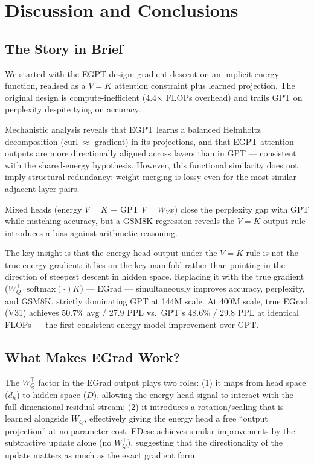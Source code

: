 \section{Discussion and Conclusions}
\label{sec:conclusions}

\subsection{The Story in Brief}

We started with the EGPT design: gradient descent on an implicit energy function,
realised as a $V{=}K$ attention constraint plus learned projection.
The original design is compute-inefficient (4.4$\times$ FLOPs overhead) and trails GPT
on perplexity despite tying on accuracy.

Mechanistic analysis reveals that EGPT learns a balanced Helmholtz decomposition
(curl $\approx$ gradient) in its projections, and that EGPT attention outputs
are more directionally aligned across layers than in GPT --- consistent with the
shared-energy hypothesis.
However, this functional similarity does not imply structural redundancy:
weight merging is lossy even for the most similar adjacent layer pairs.

Mixed heads (energy $V{=}K$ + GPT $V{=}W_V x$) close the perplexity gap with GPT
while matching accuracy, but a GSM8K regression reveals the $V{=}K$ output rule
introduces a bias against arithmetic reasoning.

The key insight is that the energy-head output under the $V{=}K$ rule is not the
true energy gradient: it lies on the key manifold rather than pointing in the direction
of steepest descent in hidden space.
Replacing it with the true gradient ($W_Q^\top \cdot \mathrm{softmax}(\cdot) K$)
--- EGrad --- simultaneously improves accuracy, perplexity, and GSM8K, strictly
dominating GPT at 144M scale.
At 400M scale, true EGrad (V31) achieves 50.7\% avg / 27.9 PPL vs.\ GPT's 48.6\% / 29.8 PPL
at identical FLOPs --- the first consistent energy-model improvement over GPT.

\subsection{What Makes EGrad Work?}

The $W_Q^\top$ factor in the EGrad output plays two roles:
(1) it maps from head space ($d_h$) to hidden space ($D$), allowing the energy-head
signal to interact with the full-dimensional residual stream;
(2) it introduces a rotation/scaling that is learned alongside $W_Q$, effectively
giving the energy head a free ``output projection'' at no parameter cost.
EDesc achieves similar improvements by the subtractive update alone (no $W_Q^\top$),
suggesting that the directionality of the update matters as much as the exact gradient form.


